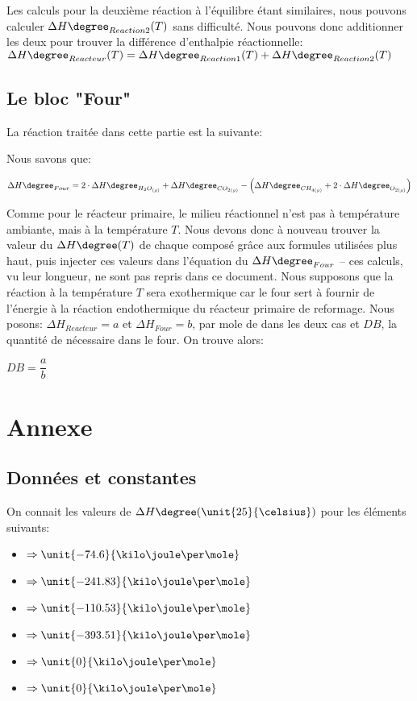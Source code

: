 Les calculs pour la deuxième réaction à l'équilibre étant similaires, nous pouvons
calculer $\Delta H\degree_{Reaction2}(T)$ sans difficulté. Nous pouvons donc additionner les deux pour trouver
la différence d'enthalpie réactionnelle: $\Delta H\degree_{Reacteur}(T)=\Delta H\degree_{Reaction1}(T)+\Delta H\degree_{Reaction2}(T)$

\subsection*{Le bloc "Four"}
La réaction traitée dans cette partie est la suivante:


Nous savons que:

$\Delta H\degree_{Four} = 2\cdot \Delta H\degree_{H_{2}O_{(g)}} + \Delta H\degree_{CO_{2(g)}}
- \left(\Delta H\degree_{CH_{4(g)}} + 2\cdot \Delta H\degree_{O_{2(g)}}\right)$

Comme pour le réacteur primaire, le milieu réactionnel n'est pas à température ambiante, mais à la température $T$. 
Nous devons donc à nouveau trouver la valeur du $\Delta H\degree(T)$ de chaque composé grâce aux formules utilisées plus haut,
puis injecter ces valeurs dans l'équation du $\Delta H\degree_{Four}$ -- ces calculs, vu leur longueur, ne sont pas repris dans
ce document.
Nous supposons que la réaction à la température $T$ sera exothermique car le four sert à fournir de l'énergie à la réaction
endothermique du réacteur primaire de reformage.
Nous posons: $\Delta H_{Reacteur} = a$ et $\Delta H_{Four} = b$, par mole de  dans les deux cas et $DB$, la quantité 
de  nécessaire dans le four.
On trouve alors:

$DB = \dfrac{a}{b}$



\section*{Annexe}
\subsection*{Données et constantes}
On connait les valeurs de $\Delta H\degree (\unit{25}{\celsius})$ pour les éléments suivants:

\begin{itemize}
\item{ $\Rightarrow \unit{-74.6}{\kilo\joule\per\mole}$}
\item{ $\Rightarrow \unit{-241.83}{\kilo\joule\per\mole}$}
\item{ $\Rightarrow \unit{-110.53}{\kilo\joule\per\mole}$}
\item{ $\Rightarrow \unit{-393.51}{\kilo\joule\per\mole}$}
\item{ $\Rightarrow \unit{0}{\kilo\joule\per\mole}$}
\item{ $\Rightarrow \unit{0}{\kilo\joule\per\mole}$}
\end{itemize}

